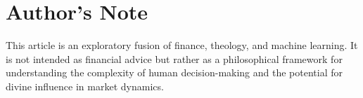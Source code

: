 \documentclass{article}
\begin{document}
\section*{Author's Note}

This article is an exploratory fusion of finance, theology, and machine learning. It is not intended as financial advice but rather as a philosophical framework for understanding the complexity of human decision-making and the potential for divine influence in market dynamics.
\end{document}
